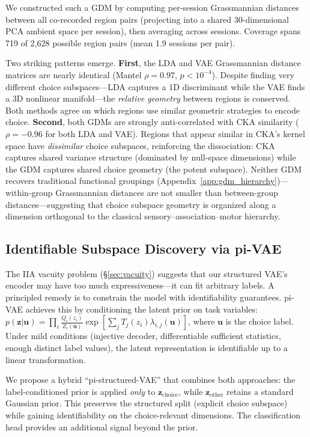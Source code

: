 \documentclass{article}
\begin{document}
We constructed such a GDM by computing per-session Grassmannian distances between all co-recorded region pairs (projecting into a shared 30-dimensional PCA ambient space per session), then averaging across sessions. Coverage spans 719 of 2,628 possible region pairs (mean 1.9 sessions per pair).

Two striking patterns emerge. \textbf{First}, the LDA and VAE Grassmannian distance matrices are nearly identical (Mantel $\rho = 0.97$, $p < 10^{-4}$). Despite finding very different choice subspaces---LDA captures a 1D discriminant while the VAE finds a 3D nonlinear manifold---the \emph{relative geometry} between regions is conserved. Both methods agree on which regions use similar geometric strategies to encode choice. \textbf{Second}, both GDMs are strongly anti-correlated with CKA similarity ($\rho = -0.96$ for both LDA and VAE). Regions that appear similar in CKA's kernel space have \emph{dissimilar} choice subspaces, reinforcing the dissociation: CKA captures shared variance structure (dominated by null-space dimensions) while the GDM captures shared choice geometry (the potent subspace). Neither GDM recovers traditional functional groupings (Appendix~\ref{app:gdm_hierarchy})---within-group Grassmannian distances are not smaller than between-group distances---suggesting that choice subspace geometry is organized along a dimension orthogonal to the classical sensory--association--motor hierarchy.

\subsection{Identifiable Subspace Discovery via pi-VAE}

The IIA vacuity problem (\S\ref{sec:vacuity}) suggests that our structured VAE's encoder may have too much expressiveness---it can fit arbitrary labels. A principled remedy is to constrain the model with identifiability guarantees. pi-VAE \citep{zhou2020pivae} achieves this by conditioning the latent prior on task variables: $p(\mathbf{z}|\mathbf{u}) = \prod_i \frac{Q_i(z_i)}{Z_i(\mathbf{u})} \exp\left[\sum_j T_j(z_i) \lambda_{i,j}(\mathbf{u})\right]$, where $\mathbf{u}$ is the choice label. Under mild conditions (injective decoder, differentiable sufficient statistics, enough distinct label values), the latent representation is identifiable up to a linear transformation.

We propose a hybrid ``pi-structured-VAE'' that combines both approaches: the label-conditioned prior is applied \emph{only} to $\mathbf{z}_{\text{choice}}$, while $\mathbf{z}_{\text{other}}$ retains a standard Gaussian prior. This preserves the structured split (explicit choice subspace) while gaining identifiability on the choice-relevant dimensions. The classification head provides an additional signal beyond the prior.
\end{document}
